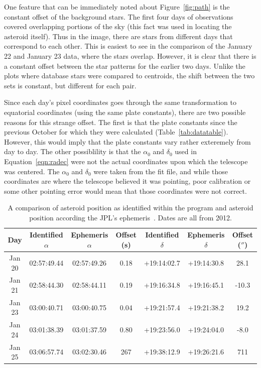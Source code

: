 \documentclass[a4paper,12pt]{article}
\begin{document}
One feature that can be immediately noted about Figure~\ref{fig:path} is the constant offset of the background stars. The first four days of observations covered overlapping portions of the sky (this fact was used in locating the asteroid itself). Thus in the image, there are stars from different days that correspond to each other. This is easiest to see in the comparison of the January 22 and January 23 data, where the stars overlap. However, it is clear that there is a constant offset between the star patterns for the earlier two days. Unlike the plots where database stars were compared to centroids, the shift between the two sets is constant, but different for each pair.

Since each day's pixel coordinates goes through the same transformation to equatorial coordinates (using the same plate constants), there are two possible reasons for this strange offset. The first is that the plate constants since the previous October for which they were calculated (Table~\ref{tab:datatable}). However, this would imply that the plate constants vary rather exteremely from day to day. The other possiblility is that the $\alpha_{0}$ and $\delta_{0}$ used in Equation~\ref{eqn:radec} were not the actual coordinates upon which the telescope was centered. The $\alpha_{0}$ and $\delta_{0}$ were taken from the fit file, and while those coordinates are where the telescope believed it was pointing, poor calibration or some other pointing error would mean that those coordinates were not correct.

\begin{center}
\begin{table}[!htbp]
  \centering
  \begin{tabular}{c||c||c||c||c||c||c}
  	Day & Identified $\alpha$ & Ephemeris $\alpha$ & Offset (s) & Identified $\delta$ & Ephemeris $\delta$ & Offset ($''$)\\
  	\hline
  	Jan 20 & 02:57:49.44 & 02:57:49.26 & 0.18 & +19:14:02.7 & +19:14:30.8 & 28.1\\
  	\hline
  	Jan 21 & 02:58:44.30 & 02:58:44.11 & 0.19 & +19:16:34.8 & +19:16:45.1 & -10.3\\
  	\hline
  	Jan 23 & 03:00:40.71 & 03:00:40.75 & 0.04 & +19:21:57.4 & +19:21:38.2 & 19.2\\
  	\hline
  	Jan 24 & 03:01:38.39 & 03:01:37.59 & 0.80 & +19:23:56.0 & +19:24:04.0 & -8.0\\
  	\hline
  	Jan 25 & 03:06:57.74 & 03:02:30.46 & 267 & +19:38:12.9 & +19:26:21.6 & 711\\
   \end{tabular}
    \caption{A comparison of asteroid position as identified within the program and asteroid position according the JPL's ephemeris~\citep{urania}. Dates are all from 2012.}
    \label{tab:position}
\end{table}
\end{center}



\end{document}
